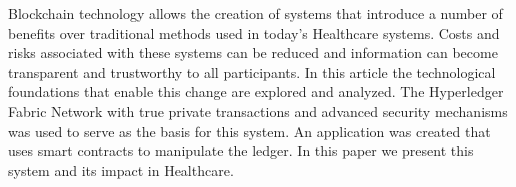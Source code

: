 \begin{tueABSTRACT}
Blockchain technology allows the creation of systems that introduce a number of
benefits over traditional methods used in today's Healthcare systems.  Costs
and risks associated with these systems can be reduced and information can
become transparent and trustworthy to all participants. In this article the
technological foundations that enable this change are explored and analyzed.
The Hyperledger Fabric Network with true private transactions and advanced
security mechanisms was used to serve as the basis for this system.  An
application was created that uses smart contracts to manipulate the ledger. In
this paper we present this system and its impact in Healthcare.
\end{tueABSTRACT}
